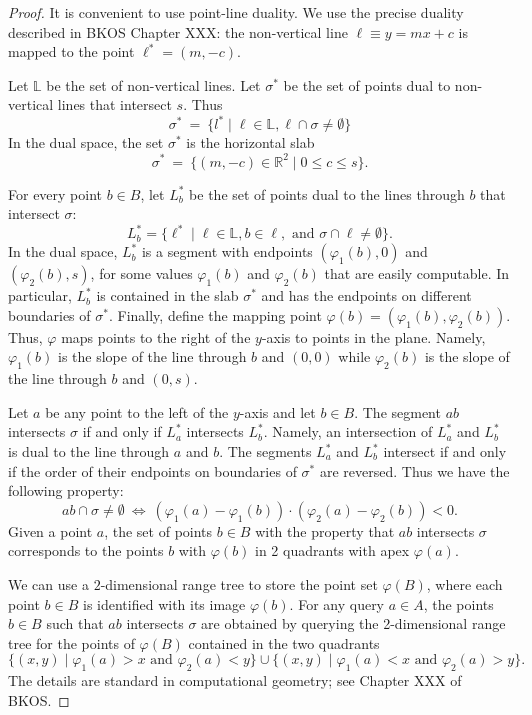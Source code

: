 \documentclass[a4paper,USenglish,numberwithinsect]{lipics}
\newcommand{\RR}{\ensuremath{\mathbb R}}  %
\newcommand{\LL}{\ensuremath{\mathbb L}}  %
\let\le\leqslant
\begin{document}
\begin{proof}
	It is convenient to use point-line duality. We use the precise duality
	described in BKOS Chapter XXX: the non-vertical line $\ell \equiv y=mx+c$
	is mapped to the point $\ell^*=(m,-c)$.
 
	Let $\LL$ be the set of non-vertical lines.
	Let $\sigma^*$ be the set of points dual to non-vertical lines that intersect $s$.
	Thus
	\[
		\sigma^* ~=~ \{ l^* \mid \ell\in \LL, \ell\cap \sigma\neq \emptyset\} 
	\]
	In the dual space, the set $\sigma^*$ is the horizontal slab 
	\[
		\sigma^* ~=~ \{ (m,-c)\in \RR^2\mid 0\le c\le s\}.
	\]
	
	For every point $b\in B$, let $L^* _b$ be the set of points dual
	to the lines through $b$ that intersect $\sigma$:
	\[
		L^*_b=\{ \ell^* \mid \ell\in \LL, b \in \ell, \text{ and } \sigma\cap \ell\not= \emptyset\}.
	\]
	In the dual space, $L^*_b$ is a segment with endpoints 
	$(\varphi_1(b),0)$ and $(\varphi_2(b),s)$, for some values $\varphi_1(b)$ and $\varphi_2(b)$
	that are easily computable.
	In particular, $L^*_b$ is contained in the slab $\sigma^*$ and has the endpoints on
	different boundaries of $\sigma^*$.
	Finally, define the mapping point $\varphi(b)=(\varphi_1(b),\varphi_2(b))$.
	Thus, $\varphi$ maps points to the right of the $y$-axis to points
	in the plane. Namely, $\varphi_1(b)$ is the slope of the line through $b$
	and $(0,0)$ while $\varphi_2(b)$ is the slope of the line through $b$ and $(0,s)$.

	Let $a$ be any point to the left of the $y$-axis and let $b\in B$.
	The segment $ab$ intersects $\sigma$ if and only if $L^*_a$ intersects $L^*_b$.
	Namely, an intersection of $L^*_a$ and $L^*_b$ is dual to the line
	through $a$ and $b$. The segments $L^*_a$ and $L^*_b$ intersect if
	and only if the order of their endpoints on boundaries of $\sigma^*$ are reversed.
	Thus we have the following property:
	\[
		ab \cap \sigma \neq \emptyset ~\Longleftrightarrow ~ 
		(\varphi_1(a)-\varphi_1(b)) \cdot (\varphi_2(a)- \varphi_2(b)) < 0.
	\]			
	Given a point $a$, the set of points $b\in B$ with the property
	that $ab$ intersects $\sigma$ corresponds to the points $b$ with $\varphi(b)$
	in 2 quadrants with apex $\varphi(a)$. 

	We can use a $2$-dimensional range tree to store the point set $\varphi(B)$,
	where each point $b\in B$ is identified with its image $\varphi(b)$. 
	For any query $a\in A$, the points $b\in B$ such that $ab$ intersects
	$\sigma$ are obtained by querying the 2-dimensional range tree for the points
	of $\varphi(B)$ contained in the two quadrants 
	\[
		\{(x,y)\mid  \varphi_1(a) > x \text{ and } \varphi_2(a) < y\} \cup
		\{(x,y)\mid  \varphi_1(a) < x \text{ and } \varphi_2(a) > y\}.
	\]
	The details are standard in computational geometry; see Chapter XXX of BKOS.
\end{proof}
\end{document}
